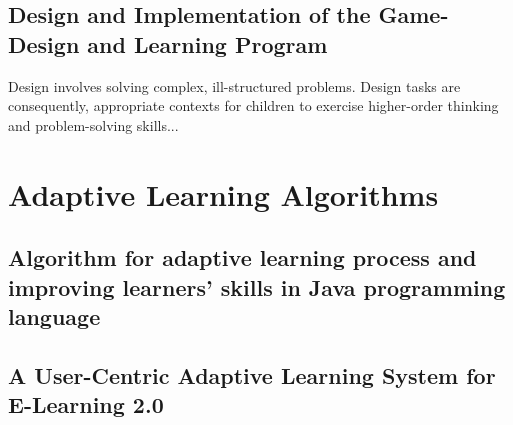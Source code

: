 \subsection{Design and Implementation of the Game-Design and Learning Program \cite{Implement}}
Design involves solving complex, ill-structured problems. Design tasks are consequently, appropriate contexts for children to exercise higher-order thinking and problem-solving skills...

\section{Adaptive Learning Algorithms}
\subsection{Algorithm for adaptive learning process and improving learners’ skills in Java programming language \cite{Algo1}}
\subsection{A User-Centric Adaptive Learning System for E-Learning 2.0 \cite{Algo2}}

